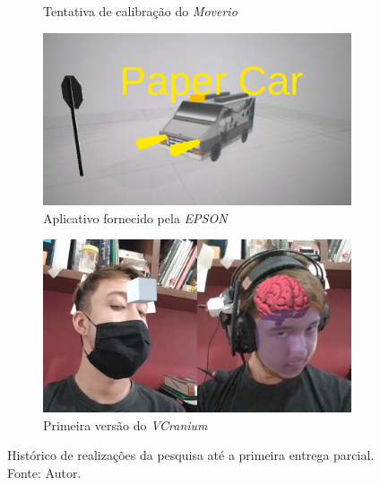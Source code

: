 \begin{figure}[ht]
\begin{subfigure}{0.45\textwidth}
        \caption{Tentativa de calibração do \textit{Moverio}}
        \label{fig:latinha}
    \end{subfigure}
    \begin{subfigure}{0.45\textwidth}
        \centering
        \includegraphics[width=.95\textwidth]{figuras/PaperCarAR.png}
        \caption{Aplicativo fornecido pela \textit{EPSON}}
        \label{fig:papercar}
    \end{subfigure}
    \begin{subfigure}{0.45\textwidth}
        \centering
        \includegraphics[width=.95\linewidth]{figuras/VCranium.png}
        \caption{Primeira versão do \textit{VCranium}}
        \label{fig:vcranium_alpha}
    \end{subfigure}
    \caption{Histórico de realizações da pesquisa até a primeira entrega parcial. Fonte: Autor.}
    \label{fig:historico}
\end{figure}



